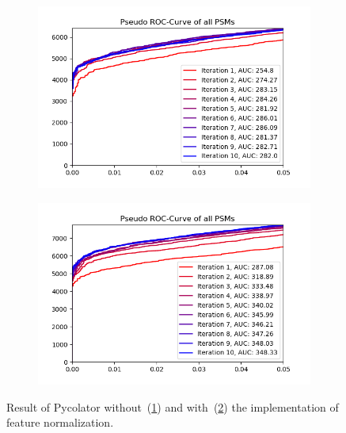 \begin{figure}
	\normalsize
	\centering
	\begin{subfigure}{0.49\textwidth}
		\includegraphics[width = \textwidth]{figures/noNorming.png}
		\caption{}
		\label{fig:before_feature_normalization}
	\end{subfigure}
	\hfill
	\begin{subfigure}{0.49\textwidth}
		\includegraphics[width = \textwidth]{figures/norming.png}
		\caption{}
		\label{fig:after_feature_normalization}
	\end{subfigure}
	\caption[Results of implementing feature normalization]{Result of Pycolator without~(\ref{fig:before_feature_normalization}) and with~(\ref{fig:after_feature_normalization}) the implementation of feature normalization. }
	\label{fig:feature_normalization}
\end{figure}
\renewcommand{\baselinestretch}{1}

